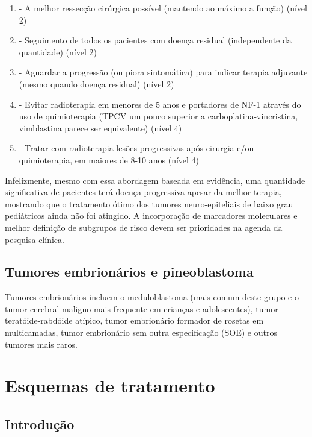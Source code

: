 \documentclass[11pt,a4paper,oldfontcommands]{memoir}
\begin{document}
\renewcommand{\labelenumi}{\Alph{enumi}}
\begin{enumerate}
\item - A melhor ressecção cirúrgica possível (mantendo ao máximo a função) (nível 2)
\item - Seguimento de todos os pacientes com doença residual (independente da quantidade) (nível 2)
\item - Aguardar a progressão (ou piora sintomática) para indicar terapia adjuvante (mesmo quando doença residual) (nível 2)
\item - Evitar radioterapia em menores de 5 anos e portadores de NF-1 através do uso de quimioterapia (TPCV um pouco superior a carboplatina-vincristina, vimblastina parece ser equivalente) (nível 4)
\item - Tratar com radioterapia lesões progressivas após cirurgia e/ou quimioterapia, em maiores de 8-10 anos (nível 4)
\end{enumerate}

Infelizmente, mesmo com essa abordagem baseada em evidência, uma quantidade significativa de pacientes terá doença progressiva apesar da melhor terapia, mostrando que o tratamento ótimo dos tumores neuro-epiteliais de baixo grau pediátricos ainda não foi atingido. A incorporação de marcadores moleculares e melhor definição de subgrupos de risco devem ser prioridades na agenda da pesquisa clínica.

\section{Tumores embrionários e pineoblastoma}

Tumores embrionários incluem o meduloblastoma (mais comum deste grupo e o tumor cerebral maligno mais frequente em crianças e adolescentes), tumor teratóide-rabdóide atípico, tumor embrionário formador de rosetas em multicamadas, tumor embrionário sem outra especificação (SOE) e outros tumores mais raros. 

\chapter{Esquemas de tratamento}

\section{Introdução}
\end{document}

